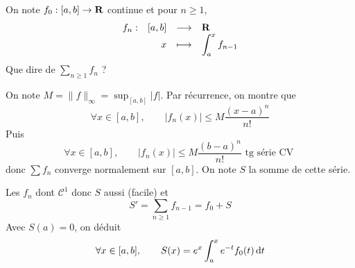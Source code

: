 On note $f_0: [a, b] \to  \mathbf R$ continue et pour $n\geq 1$, \[
\begin{array}{rrcl}
    f_n:& [a, b] & \longrightarrow & \mathbf R \\
    & x & \longmapsto & \displaystyle\int_a^xf_{n-1}
\end{array}
\] 
Que dire de $\sum _{n\geq 1}f_n$ ?

On note $M= \|f\|_\infty=\sup_{[a, b]}\limits|f|$. Par récurrence, on montre que \[
    \forall  x \in  [a, b], \qquad  |f_n(x)| \leq M \frac{(x-a)^n}{n!}
\] 
Puis \[
    \forall  x \in  [a, b], \qquad  |f_n(x)|\leq M \frac{(b-a)^n}{n!} \text{ tg série CV }
\]
donc $\sum f_n$ converge normalement sur  $[a, b]$. On note  $S$ la somme de cette série.

Les  $f_n$ dont  $\mathcal  C^1$ donc $S$ aussi (facile) et  \[
    S'=\sum_{n\geq 1}f_{n-1}=f_0+S
\] 
Avec $S(a)=0$, on déduit \[
    \forall  x \in  [a, b], \qquad  S(x)=e^x\int_a^xe^{-t}f_0(t)\mathop{}\!\mathrm d t
\] 

\endchapter
